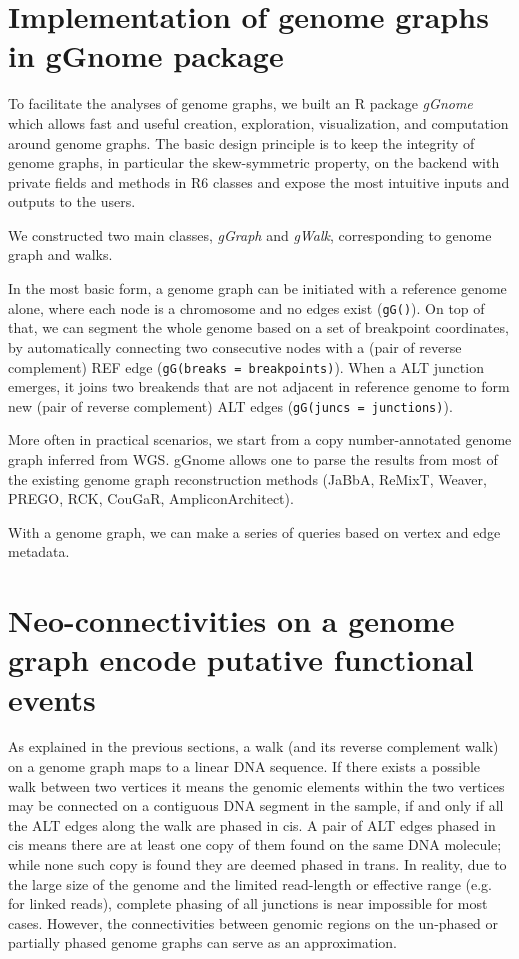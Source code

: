 \documentclass[phd,tocprelim]{cornell}
\begin{document}
\section{Implementation of genome graphs in gGnome package}
To facilitate the analyses of genome graphs, we built an R package \textit{gGnome} which allows fast and useful creation, exploration, visualization, and computation around genome graphs. The basic design principle is to keep the integrity of genome graphs, in particular the skew-symmetric property, on the backend with private fields and methods in R6 classes and expose the most intuitive inputs and outputs to the users.

We constructed two main classes, \textit{gGraph} and \textit{gWalk}, corresponding to genome graph and walks.

In the most basic form, a genome graph can be initiated with a reference genome alone, where each node is a chromosome and no edges exist (\texttt{gG()}). On top of that, we can segment the whole genome based on a set of breakpoint coordinates, by automatically connecting two consecutive nodes with a (pair of reverse complement) REF edge (\texttt{gG(breaks = breakpoints)}). When a ALT junction emerges, it joins two breakends that are not adjacent in reference genome to form new (pair of reverse complement) ALT edges (\texttt{gG(juncs = junctions)}).

More often in practical scenarios, we start from a copy number-annotated genome graph inferred from WGS. gGnome allows one to parse the results from most of the existing genome graph reconstruction methods (JaBbA, ReMixT, Weaver, PREGO, RCK, CouGaR, AmpliconArchitect). 

With a genome graph, we can make a series of queries based on vertex and edge metadata.


\section{Neo-connectivities on a genome graph encode putative functional events}
As explained in the previous sections, a walk (and its reverse complement walk) on a genome graph maps to a linear DNA sequence. If there exists a possible walk between two vertices it means the genomic elements within the two vertices may be connected on a contiguous DNA segment in the sample, if and only if all the ALT edges along the walk are phased in cis. A pair of ALT edges phased in cis means there are at least one copy of them found on the same DNA molecule; while none such copy is found they are deemed phased in trans. In reality, due to the large size of the genome and the limited read-length or effective range (e.g. for linked reads), complete phasing of all junctions is near impossible for most cases. However, the connectivities between genomic regions on the un-phased or partially phased genome graphs can serve as an approximation. 
\end{document}
